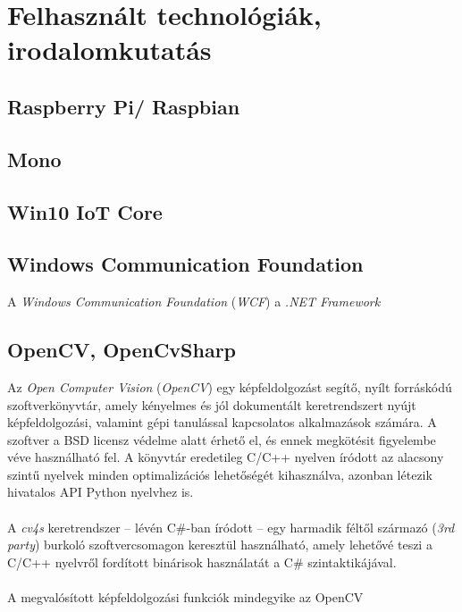 \chapter{Felhasznált technológiák, irodalomkutatás}
\section{Raspberry Pi/ Raspbian}

\section{Mono}

\section{Win10 IoT Core}

\section{Windows Communication Foundation}
A \emph{Windows Communication Foundation} (\emph{WCF}) a \textit{.NET Framework} 

\section{OpenCV, OpenCvSharp}

Az \emph{Open Computer Vision} (\emph{OpenCV}) egy képfeldolgozást segítő, nyílt forráskódú szoftverkönyvtár, amely kényelmes és jól dokumentált keretrendszert nyújt képfeldolgozási, valamint gépi tanulással kapcsolatos alkalmazások számára. A szoftver a BSD licensz védelme alatt érhető el, és ennek megkötésit figyelembe véve használható fel. A könyvtár eredetileg C/C++ nyelven íródott az alacsony szintű nyelvek minden optimalizációs lehetőségét kihasználva, azonban létezik hivatalos API Python nyelvhez is. \\
\\
A \emph{cv4s} keretrendszer -- lévén C\#-ban íródott -- egy harmadik féltől származó (\textit{3rd party}) burkoló szoftvercsomagon keresztül használható, amely lehetővé teszi a C/C++ nyelvről fordított binárisok használatát a C\# szintaktikájával. \\
\\
A megvalósított képfeldolgozási funkciók mindegyike az OpenCV
